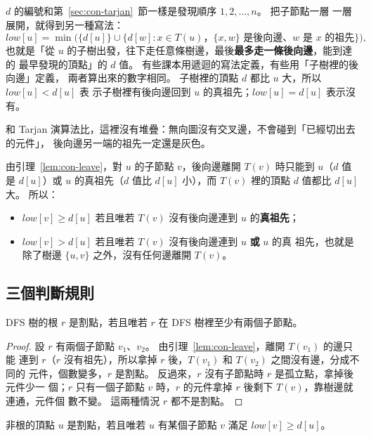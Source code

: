 $d$ 的編號和第~\ref{sec:con-tarjan}~節一樣是發現順序 $1, 2, \ldots, n$。 把子節點一層
一層展開，就得到另一種寫法：
\[
\mathit{low}[u] = \min\bigl(\{d[u]\} \cup \{d[w] : x \in T(u)，\{x, w\} \text{ 是後向邊、} w \text{ 是 } x \text{ 的祖先}\}\bigr),
\]
也就是「從 $u$ 的子樹出發，往下走任意條樹邊，最後\textbf{最多走一條後向邊}，能到達的
最早發現的頂點」的 $d$ 值。 有些課本用遞迴的寫法定義，有些用「子樹裡的後向邊」定義，
兩者算出來的數字相同。 子樹裡的頂點 $d$ 都比 $u$ 大，所以 $\mathit{low}[u] < d[u]$ 表
示子樹裡有後向邊回到 $u$ 的真祖先；$\mathit{low}[u] = d[u]$ 表示沒有。

和 Tarjan 演算法比，這裡沒有堆疊：無向圖沒有交叉邊，不會碰到「已經切出去的元件」，
後向邊另一端的祖先一定還是灰色。

由引理~\ref{lem:con-leave}，對 $u$ 的子節點 $v$，後向邊離開 $T(v)$ 時只能到 $u$（$d$
值是 $d[u]$）或 $u$ 的真祖先（$d$ 值比 $d[u]$ 小），而 $T(v)$ 裡的頂點 $d$ 值都比
$d[u]$ 大。 所以：
\begin{itemize}
\item $\mathit{low}[v] \ge d[u]$ 若且唯若 $T(v)$ 沒有後向邊連到 $u$ 的\textbf{真祖先}；
\item $\mathit{low}[v] > d[u]$ 若且唯若 $T(v)$ 沒有後向邊連到 $u$ \textbf{或} $u$ 的真
祖先，也就是除了樹邊 $\{u, v\}$ 之外，沒有任何邊離開 $T(v)$。
\end{itemize}

\subsection{三個判斷規則}

\begin{theorem}[根]
\label{thm:con-root}
DFS 樹的根 $r$ 是割點，若且唯若 $r$ 在 DFS 樹裡至少有兩個子節點。
\end{theorem}

\begin{proof}
設 $r$ 有兩個子節點 $v_1$、$v_2$。 由引理~\ref{lem:con-leave}，離開 $T(v_1)$ 的邊只能
連到 $r$（$r$ 沒有祖先），所以拿掉 $r$ 後，$T(v_1)$ 和 $T(v_2)$ 之間沒有邊，分成不同的
元件，個數變多，$r$ 是割點。 反過來，$r$ 沒有子節點時 $r$ 是孤立點，拿掉後元件少一
個；$r$ 只有一個子節點 $v$ 時，$r$ 的元件拿掉 $r$ 後剩下 $T(v)$，靠樹邊就連通，元件個
數不變。 這兩種情況 $r$ 都不是割點。
\end{proof}

\begin{theorem}[非根]
\label{thm:con-nonroot}
非根的頂點 $u$ 是割點，若且唯若 $u$ 有某個子節點 $v$ 滿足 $\mathit{low}[v] \ge d[u]$。
\end{theorem}

